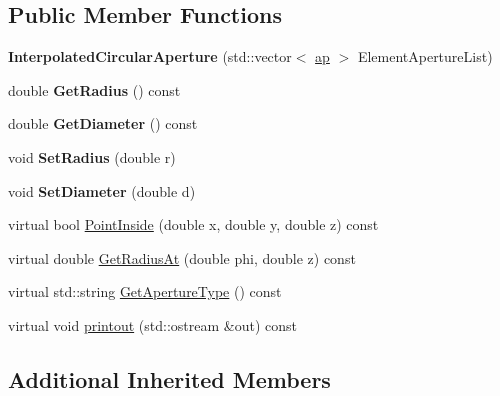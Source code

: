\subsection*{Public Member Functions}
\begin{DoxyCompactItemize}
\item 
\mbox{\label{classInterpolatedCircularAperture_ace9034e16c850e8522a092016fba70d5}} 
{\bfseries Interpolated\+Circular\+Aperture} (std\+::vector$<$ \hyperlink{structInterpolatedAperture_1_1ap}{ap} $>$ Element\+Aperture\+List)
\item 
\mbox{\label{classInterpolatedCircularAperture_a0d6548d2b63b73f1936663742a7f925c}} 
double {\bfseries Get\+Radius} () const
\item 
\mbox{\label{classInterpolatedCircularAperture_ae7797994de32856e7bc2d04ce43e86e1}} 
double {\bfseries Get\+Diameter} () const
\item 
\mbox{\label{classInterpolatedCircularAperture_a89abff39be85ea5173ef3c5c036a02bb}} 
void {\bfseries Set\+Radius} (double r)
\item 
\mbox{\label{classInterpolatedCircularAperture_a3becf78e1850d7cfaea826794be0ff38}} 
void {\bfseries Set\+Diameter} (double d)
\item 
virtual bool \hyperlink{classInterpolatedCircularAperture_aeb31875191b05bd63bd00fe11294a432}{Point\+Inside} (double x, double y, double z) const
\item 
virtual double \hyperlink{classInterpolatedCircularAperture_a4c614ba51b5da0e01808f719f6a7511f}{Get\+Radius\+At} (double phi, double z) const
\item 
virtual std\+::string \hyperlink{classInterpolatedCircularAperture_ad6c2112ec4e0bd1b21b679e3fab08704}{Get\+Aperture\+Type} () const
\item 
virtual void \hyperlink{classInterpolatedCircularAperture_af32b8d603ed9dd511c3b00a045400795}{printout} (std\+::ostream \&out) const
\end{DoxyCompactItemize}
\subsection*{Additional Inherited Members}


